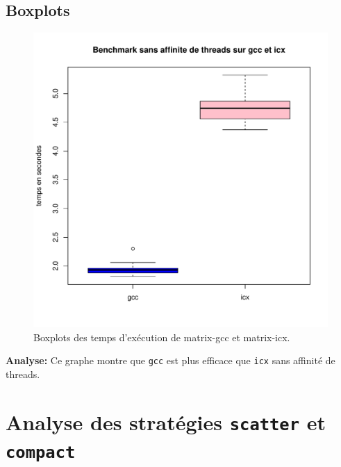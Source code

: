 \documentclass{rapport}
\begin{document}
\subsection{Boxplots}

\begin{figure}[H]
    \centering
    \includegraphics[width=1\textwidth]{../tp3/benchmark/bench_no_affinity.pdf}
    \caption{Boxplots des temps d'exécution de matrix-gcc et matrix-icx.}
\end{figure}

\textbf{Analyse:} Ce graphe montre que \texttt{gcc} est plus efficace que \texttt{icx} sans affinité de threads.


\section{Analyse des stratégies \texttt{scatter} et \texttt{compact}}
\end{document}
